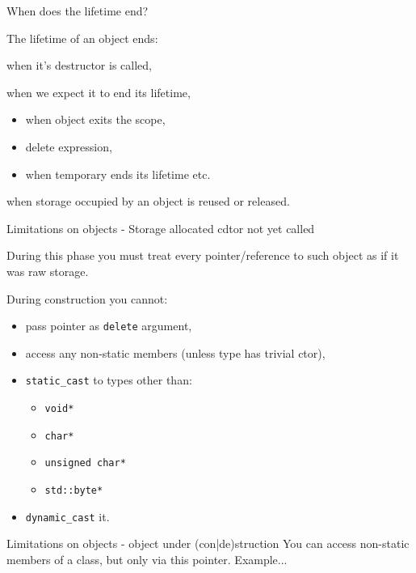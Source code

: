 \documentclass{panicsoftware-presentation}
\makeatletter
\newenvironment{itemizeSeq}{\begin{itemize}[<+-|alert@+>]}{\end{itemize}}
\makeatother
\begin{document}
\begin{frame}{When does the lifetime end?}

\centerline{The lifetime of an object \alert{ends}:}

\begin{description}[<+-|alert@+>]

\item[class types] when it's destructor is called,
\item[non-class types] when we expect it to end its lifetime, 
\begin{itemize}
	\item when object exits the scope,
	\item delete expression,
	\item when temporary ends its lifetime etc.
\end{itemize}
\item[any type] when storage occupied by an object is reused or released.
\end{description}

\end{frame}

\begin{frame}{Limitations on objects - Storage allocated cdtor not yet called}

During this phase you must treat every pointer/reference to such object as if it was raw storage.

During construction you cannot:
\begin{itemizeSeq}
	\item pass pointer as \texttt{delete} argument,
	\item access any non-static members (unless type has trivial ctor),
	\item \texttt{static\_cast} to types other than:
	\begin{itemize}
		\item \texttt{void*}
		\item \texttt{char*}
		\item \texttt{unsigned char*}
		\item \texttt{std::byte*}
	\end{itemize} 
	\item \texttt{dynamic\_cast} it.
\end{itemizeSeq}

\end{frame}

\begin{frame}{Limitations on objects - object under (con|de)struction}
You \alert{can access non-static members of a class}, but only via \alert{this} pointer.
\vfill
Example...
\end{frame}
\end{document}
